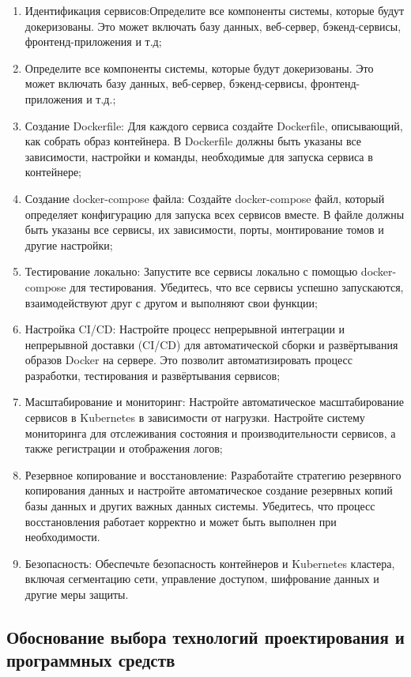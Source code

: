 \begin{enumerate}
	\item Идентификация сервисов:Определите все компоненты системы, которые будут докеризованы. Это может включать базу данных, веб-сервер, бэкенд-сервисы, фронтенд-приложения и т.д; 
	\item Определите все компоненты системы, которые будут докеризованы. Это может включать базу данных, веб-сервер, бэкенд-сервисы, фронтенд-приложения и т.д.;
	\item Создание Dockerfile: Для каждого сервиса создайте Dockerfile, описывающий, как собрать образ контейнера. В Dockerfile должны быть указаны все зависимости, настройки и команды, необходимые для запуска сервиса в контейнере;
	\item Создание docker-compose файла: Создайте docker-compose файл, который определяет конфигурацию для запуска всех сервисов вместе. В файле должны быть указаны все сервисы, их зависимости, порты, монтирование томов и другие настройки;
	\item Тестирование локально: Запустите все сервисы локально с помощью docker-compose для тестирования. Убедитесь, что все сервисы успешно запускаются, взаимодействуют друг с другом и выполняют свои функции;
	\item Настройка CI/CD: Настройте процесс непрерывной интеграции и непрерывной доставки (CI/CD) для автоматической сборки и развёртывания образов Docker на сервере. Это позволит автоматизировать процесс разработки, тестирования и развёртывания сервисов;
	\item Масштабирование и мониторинг: Настройте автоматическое масштабирование сервисов в Kubernetes в зависимости от нагрузки. Настройте систему мониторинга для отслеживания состояния и производительности сервисов, а также регистрации и отображения логов;
	\item Резервное копирование и восстановление: Разработайте стратегию резервного копирования данных и настройте автоматическое создание резервных копий базы данных и других важных данных системы. Убедитесь, что процесс восстановления работает корректно и может быть выполнен при необходимости.
	\item Безопасность: Обеспечьте безопасность контейнеров и Kubernetes кластера, включая сегментацию сети, управление доступом, шифрование данных и другие меры защиты.
\end{enumerate}


\subsection{Обоснование выбора технологий проектирования и программных средств}
